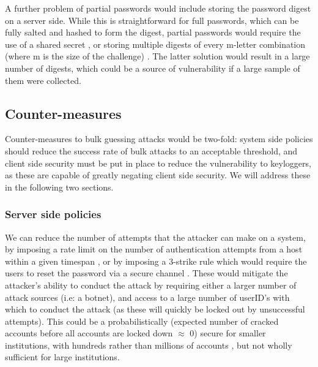 \documentclass[british,10pt,a4paper]{article}
\begin{document}
A further problem of partial passwords would include storing the password digest on a server side. While this is straightforward for full passwords, which can be fully salted and hashed to form the digest, partial passwords would require the use of a shared secret \cite{smartarchitect}, or storing multiple digests of every m-letter combination (where m is the size of the challenge) \cite{smartarchitect}. The latter solution would result in a large number of digests, which could be a source of vulnerability if a large sample of them were collected. 





\subsection{Counter-measures}
Counter-measures to bulk guessing attacks would be two-fold: system side policies should reduce the success rate of bulk attacks to an acceptable threshold, and client side security must be put in place to reduce the vulnerability to keyloggers, as these are capable of greatly negating client side security. We will address these in the following two sections.

\subsubsection{Server side policies}
We can reduce the number of attempts that the attacker can make on a system, by imposing a rate limit on the number of authentication attempts from a host within a given timespan \cite{Florencio2007-yp}, or by imposing a 3-strike rule which would require the users to reset the password via a secure channel \cite{Florencio2007-yp}. These would mitigate the attacker's ability to conduct the attack by requiring either a larger number of attack sources (i.e: a botnet), and access to a large number of userID's with which to conduct the attack (as these will quickly be locked out by unsuccessful attempts). This could be a probabilistically (expected number of cracked accounts before all accounts are locked down $\approx$ 0) secure for smaller institutions, with hundreds rather than millions of accounts \cite{Florencio2007-yp}, but not wholly sufficient for large institutions. 
\end{document}
